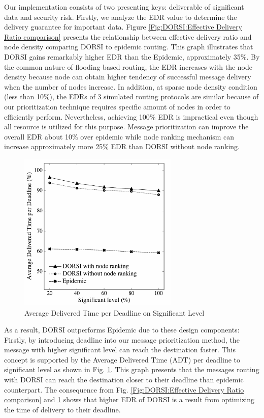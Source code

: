 Our implementation consists of two presenting keys: deliverable of significant data and security risk. 
Firstly, we analyze the EDR value to determine the delivery guarantee for important data. 
Figure \ref{Fig:DORSI:Effective Delivery Ratio comparison} presents the relationship between effective delivery ratio and node density comparing DORSI to epidemic routing. 
This graph illustrates that DORSI gains remarkably higher EDR than the Epidemic, approximately 35\%. 
By the common nature of flooding based routing, the EDR increases with the node density because node can obtain higher tendency of successful message delivery when the number of nodes increase. 
In addition, at sparse node density condition (less than 10\%), the EDRs of 3 simulated routing protocols are similar because of our prioritization technique requires specific amount of nodes in order to efficiently perform. 
Nevertheless, achieving 100\% EDR is impractical even though all resource is utilized for this purpose. 
Message prioritization can improve the overall EDR about 10\% over epidemic while node ranking mechanism can increase approximately more 25\% EDR than DORSI without node ranking.

\begin{figure}[!h]
\centering
\includegraphics[width=3in]{Graphs/ADTD_significantLevel.pdf}
\caption{Average Delivered Time per Deadline on Significant Level}
\label{Fig:DORSI:Average Delivered Time per Deadline on Significant Level}
\end{figure}

As a result, DORSI outperforms Epidemic due to these design components: Firstly, by introducing deadline into our message prioritization method, the message with higher significant level can reach the destination faster. 
This concept is supported by the Average Delivered Time (ADT) per deadline to significant level as shown in Fig. \ref{Fig:DORSI:Average Delivered Time per Deadline on Significant Level}. This graph presents that the messages routing with DORSI can reach the destination closer to their deadline than epidemic counterpart. 
The consequence from Fig. \ref{Fig:DORSI:Effective Delivery Ratio comparison} and \ref{Fig:DORSI:Average Delivered Time per Deadline on Significant Level} shows that higher EDR of DORSI is a result from optimizing the time of delivery to their deadline.

